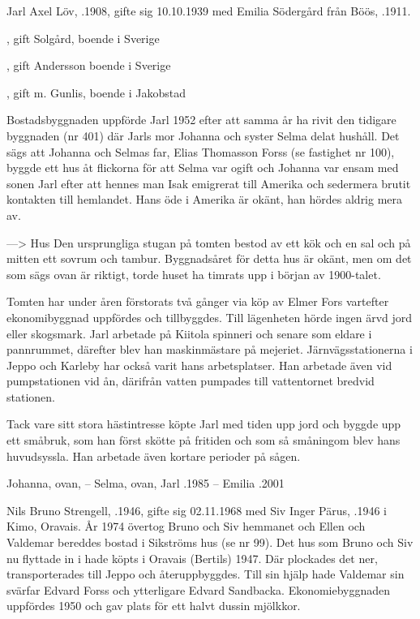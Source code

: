 Jarl Axel Löv, .1908, gifte sig 10.10.1939 med Emilia Södergård från Böös, .1911.
\begin{jhchildren}
  \item {}, gift Solgård, boende i Sverige
  \item {}, gift Andersson boende i Sverige
  \item {}, gift m. Gunlis, boende i Jakobstad
\end{jhchildren}

Bostadsbyggnaden uppförde Jarl 1952 efter att samma år ha rivit den tidigare byggnaden (nr 401) där Jarls mor Johanna och syster Selma delat hushåll. Det sägs  att Johanna och Selmas far, Elias Thomasson Forss (se fastighet nr 100), byggde ett hus åt flickorna för att Selma var ogift och Johanna var ensam med sonen Jarl efter att hennes man Isak emigrerat till Amerika och sedermera brutit kontakten till hemlandet. Hans öde i Amerika är okänt, han hördes aldrig mera av.

--->  Hus 
Den ursprungliga stugan på tomten bestod av ett kök och en sal och på mitten ett sovrum och tambur. Byggnadsåret för detta hus är okänt, men om det som sägs ovan är riktigt, torde huset ha timrats upp i början av 1900-talet.

Tomten har under åren förstorats två gånger via köp av Elmer Fors vartefter ekonomibyggnad uppfördes och tillbyggdes. Till lägenheten hörde ingen ärvd jord eller skogsmark. Jarl arbetade på Kiitola spinneri och senare som eldare i pannrummet, därefter blev han maskinmästare på mejeriet. Järnvägsstationerna i Jeppo och Karleby har också varit hans arbetsplatser. Han arbetade även vid pumpstationen vid ån, därifrån vatten pumpades till vattentornet bredvid stationen.

Tack vare sitt stora hästintresse köpte Jarl med tiden upp jord och byggde upp ett småbruk, som han först skötte på fritiden och som så småningom blev hans huvudsyssla. Han arbetade även kortare perioder på sågen.

Johanna, ovan,   --  Selma, ovan, 
Jarl .1985  --  Emilia .2001




Nils Bruno Strengell, .1946, gifte sig 02.11.1968 med Siv Inger Pärus, .1946 i Kimo, Oravais. År 1974 övertog Bruno och Siv hemmanet och Ellen och Valdemar bereddes bostad i Sikströms hus (se nr 99). Det hus som Bruno och Siv nu flyttade in i hade köpts i Oravais (Bertils) 1947. Där plockades det ner, transporterades till Jeppo och återuppbyggdes. Till sin hjälp hade Valdemar sin svärfar Edvard Forss och ytterligare Edvard Sandbacka. Ekonomiebyggnaden uppfördes 1950 och gav plats för ett halvt dussin mjölkkor.

